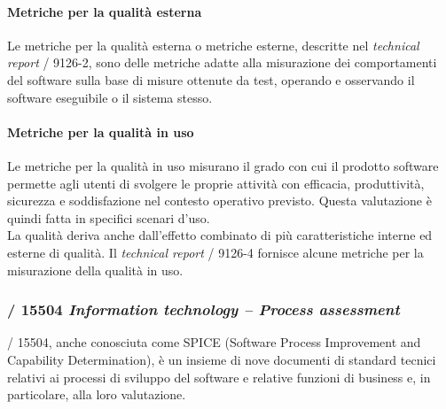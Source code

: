   \paragraph{Metriche per la qualità esterna}
    Le metriche per la qualità esterna o metriche esterne, descritte nel \emph{technical report} / 9126-2,
    sono delle metriche adatte alla misurazione dei comportamenti del software sulla base di misure ottenute da test, operando e osservando il software eseguibile o il sistema stesso.\\

  \paragraph{Metriche per la qualità in uso}
    Le metriche per la qualità in uso misurano il grado con cui il prodotto software permette agli utenti di svolgere le proprie attività con efficacia, produttività, sicurezza e soddisfazione nel contesto operativo previsto.
    Questa valutazione è quindi fatta in specifici scenari d'uso.\\
    La qualità deriva anche dall'effetto combinato di più caratteristiche interne ed esterne di qualità.
    Il \emph{technical report} / 9126-4 fornisce alcune metriche per la misurazione della qualità in uso.\\


  \subsubsection{/ 15504 \emph{Information technology – Process assessment}}

  / 15504, anche conosciuta come SPICE (Software Process Improvement and Capability Determination),
  è un insieme di nove documenti di standard tecnici relativi ai processi di sviluppo del software e relative funzioni di business e, in particolare, alla loro valutazione.

